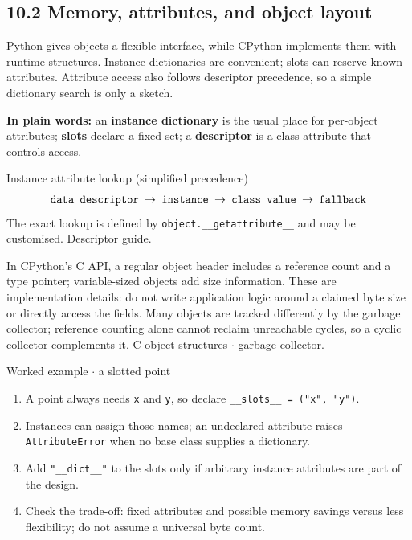 \documentclass[11pt]{article}
\begin{document}
\begin{keepsection}
\section{10.2 Memory, attributes, and object layout}

Python gives objects a flexible interface, while CPython implements them with runtime structures. Instance dictionaries are convenient; slots can reserve known attributes. Attribute access also follows descriptor precedence, so a simple dictionary search is only a sketch.

\begin{plainbox}\textbf{In plain words:} an \textbf{instance dictionary} is the usual place for per-object attributes; \textbf{slots} declare a fixed set; a \textbf{descriptor} is a class attribute that controls access.\end{plainbox}

\begin{equationcard}{Instance attribute lookup (simplified precedence)}
\[ \begin{gathered} \texttt{data descriptor \ensuremath{\to} instance \ensuremath{\to} class value \ensuremath{\to} fallback} \end{gathered} \]
{\small The exact lookup is defined by \texttt{object.\_\_getattribute\_\_} and may be customised. Descriptor guide.}
\end{equationcard}

In CPython’s C API, a regular object header includes a reference count and a type pointer; variable-sized objects add size information. These are implementation details: do not write application logic around a claimed byte size or directly access the fields. Many objects are tracked differently by the garbage collector; reference counting alone cannot reclaim unreachable cycles, so a cyclic collector complements it. C object structures \ensuremath{\cdot} garbage collector.

\begin{workedbox}{Worked example \ensuremath{\cdot} a slotted point}
\begin{enumerate}
\item A point always needs \texttt{x} and \texttt{y}, so declare \texttt{\_\_slots\_\_ = ("x", "y")}.
\item Instances can assign those names; an undeclared attribute raises \texttt{AttributeError} when no base class supplies a dictionary.
\item Add \texttt{"\_\_dict\_\_"} to the slots only if arbitrary instance attributes are part of the design.
\item Check the trade-off: fixed attributes and possible memory savings versus less flexibility; do not assume a universal byte count.
\end{enumerate}
\end{workedbox}


\end{keepsection}
\end{document}
